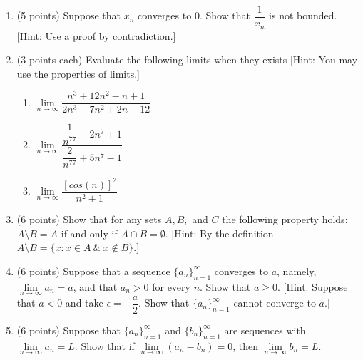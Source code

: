 \documentclass[fleqn]{article}
\begin{document}
\begin{enumerate}
    \item (5 points) Suppose that $x_n$ converges to $0$. Show that $\dfrac{1}{x_n}$ is not bounded. 
    [Hint: Use a proof by contradiction.]




    \item (3 points each) Evaluate the following limits when they exists [Hint: You may use the
    properties of limits.]
    \begin{enumerate}
      \item $\lim\limits_{n\to\infty} \dfrac{n^3+12n^2-n+1}{2n^3-7n^2+2n-12}$




      \item $\lim\limits_{n\to\infty} \dfrac{\dfrac{1}{n^77}-2n^7+1}{\dfrac{2}{n^77}+5n^7-1}$
    


      \item $\lim\limits_{n\to\infty} \dfrac{\left[cos(n)\right]^2}{n^2+1}$



    \end{enumerate}
    

    \item (6 points) Show that for any sets $A, B,$ and $C$ the following property holds: 
    $A \setminus B=A$ if and only if $A \cap B=\emptyset$. 
    [Hint: By the definition $A \setminus B=\{x: x \in A ~ \& ~ x \notin B\}$.]




    \item (6 points) Suppose that a sequence $\{a_n\}_{n=1}^{\infty}$ converges to $a$, namely,
    $\lim\limits_{n\to\infty} a_n=a$, and that $a_n>0$ for every $n$. Show that $a\geq 0$. 
    [Hint: Suppose that $a<0$ and take $\epsilon=-\dfrac{a}{2}$. Show that $\{a_n\}_{n=1}^{\infty}$ cannot converge to $a$.]




    \item (6 points) Suppose that $\{a_n\}_{n=1}^{\infty}$ and $\{b_n\}_{n=1}^{\infty}$ are sequences with $\lim\limits_{n\to\infty} a_n=L$.
    Show that if $\lim\limits_{n\to\infty} (a_n-b_n)=0$, then $\lim\limits_{n\to\infty} b_n=L$.


\end{enumerate}
\end{document}
